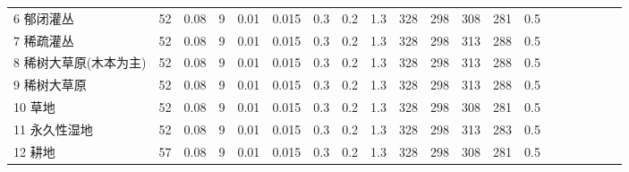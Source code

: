 \begin{landscape}
\begin{table}[htbp]
\begin{tabular}{@{}lccccccccccccccccccc@{}}
      6 郁闭灌丛              & 52                   & 0.08     & 9   & 0.01 & 0.015               & 0.3   & 0.2   & 1.3   & 328               & 298               & 308                 & 281                & 0.5                \\
      7 稀疏灌丛              & 52                   & 0.08     & 9   & 0.01 & 0.015               & 0.3   & 0.2   & 1.3   & 328               & 298               & 313                 & 288                & 0.5                \\
      8 稀树大草原(木本为主)  & 52                   & 0.08     & 9   & 0.01 & 0.015               & 0.3   & 0.2   & 1.3   & 328               & 298               & 313                 & 288                & 0.5                \\
      9 稀树大草原            & 52                   & 0.08     & 9   & 0.01 & 0.015               & 0.3   & 0.2   & 1.3   & 328               & 298               & 313                 & 288                & 0.5                \\
      10 草地                 & 52                   & 0.08     & 9   & 0.01 & 0.015               & 0.3   & 0.2   & 1.3   & 328               & 298               & 308                 & 281                & 0.5                \\
      11 永久性湿地           & 52                   & 0.08     & 9   & 0.01 & 0.015               & 0.3   & 0.2   & 1.3   & 328               & 298               & 313                 & 283                & 0.5                \\
      12 耕地                 & 57                   & 0.08     & 9   & 0.01 & 0.015               & 0.3   & 0.2   & 1.3   & 328               & 298               & 308                 & 281                & 0.5                \\ %
%

\end{tabular}
\end{table}
\end{landscape}
